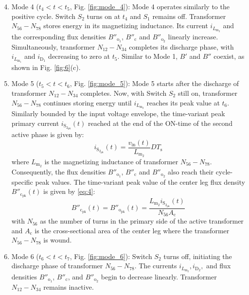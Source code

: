 \documentclass[lettersize,journal]{IEEEtran}
\begin{document}
\begin{enumerate}
    \setcounter{enumi}{3}
    \item Mode 4 ($t_4 < t < t_5$, Fig. \ref{fig:mode_4}): Mode 4 operates similarly to the positive cycle. Switch $S_2$ turns on at $t_4$ and $S_1$ remains off. Transformer $N_{56}-N_{78}$ stores energy in its magnetizing inductance. Its current $i_{L_{\mathrm{m}_2}}$ and the corresponding flux densities $B''_{\mathrm{o}_1}$, $B''_{\mathrm{c}}$ and $B''_{\mathrm{o}_2}$ linearly increase. Simultaneously, transformer $N_{12}-N_{34}$ completes its discharge phase, with $i_{L_{\mathrm{m}_1}}$ and $i_{\mathrm{D}_1}$ decreasing to zero at $t_5$. Similar to Mode 1,  $B'$ and $B''$ coexist, as shown in Fig. \ref{fig:6}(c).

    \item Mode 5 ($t_5 < t < t_6$, Fig. \ref{fig:mode_5}): Mode 5 starts after the discharge of transformer $N_{12}-N_{34}$ completes. Now, with Switch $S_2$ still on, transformer $N_{56}-N_{78}$ continues storing energy until $i_{L_{\mathrm{m}_2}}$ reaches its peak value at $t_6$. Similarly bounded by the input voltage envelope, the time-variant peak primary current $i_{\mathrm{S}_{2_{\mathrm{pk}}}}(t)$ reached at the end of the ON-time of the second active phase is given by:
    \begin{equation}
    \label{eq:3}
    i_{\mathrm{S}_{2_{\mathrm{pk}}}}(t) = \frac{v_{\mathrm{in}}(t)}{L_{\mathrm{m}_2}} D T_{\mathrm{s}} 
    \end{equation}
    where $L_{\mathrm{m}_2}$ is the magnetizing inductance of transformer $N_{56}-N_{78}$. Consequently, the flux densities $B''_{\mathrm{o}_1}$, $B''_{\mathrm{c}}$ and $B''_{\mathrm{o}_2}$ also reach their cycle-specific peak values. The time-variant peak value of the center leg flux density $B''_{\mathrm{c}_{\mathrm{pk}}}(t)$ is given by \eqref{eq:4}:
    \begin{equation}
    \label{eq:4}
    B''_{\mathrm{c}_{\mathrm{pk}}}(t) = B''_{\mathrm{o}_{\mathrm{pk}}}(t) = \frac{L_{\mathrm{m}_2} i_{\mathrm{S}_{2_{\mathrm{pk}}}}(t)}{N_{56} A_{\mathrm{c}}} 
    \end{equation}
    with $N_{56}$ as the number of turns in the primary side of the active transformer and $A_{\mathrm{c}}$ is the cross-sectional area of the center leg where the transformer $N_{56}-N_{78}$ is wound.

    \item Mode 6 ($t_6 < t < t_7$, Fig. \ref{fig:mode_6}): Switch $S_2$ turns off, initiating the discharge phase of transformer $N_{56}-N_{78}$. The currents $i_{L_{\mathrm{m}_2}}, i_{\mathrm{D}_2},$ and flux densities $B''_{\mathrm{o}_1}$, $B''_{\mathrm{c}}$, and $B''_{\mathrm{o}_2}$ begin to decrease linearly. Transformer $N_{12}-N_{34}$ remains inactive.
\end{enumerate}
\end{document}
